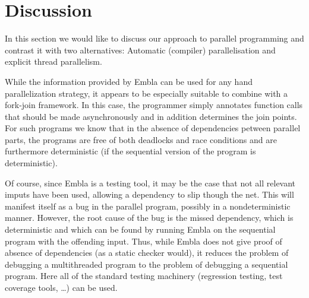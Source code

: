 \section{Discussion}

In this section we would like to discuss our approach to parallel
programming and contrast it with two alternatives: Automatic 
(compiler) parallelisation and explicit thread parallelism.

While the information provided by Embla can be used for any hand 
parallelization strategy, it appears to be especially suitable to
combine with a fork-join framework. In this case, the programmer 
simply annotates function calls that should be made asynchronously 
and in addition determines the join points. For such programs we
know that in the absence of dependencies petween parallel parts,
the programs are free of both deadlocks and race conditions and are 
furthermore deterministic (if the sequential version of the program 
is deterministic).

Of course, since Embla is a testing tool, it may be the case that not
all relevant imputs have been used, allowing a dependency to slip
though the net. This will manifest itself as a bug in the parallel
program, possibly in a nondeterministic manner. However, the root
cause of the bug is the missed dependency, which is deterministic and
which can be found by running Embla on the sequential program 
with the offending input. Thus,
while Embla does not give proof of absence of dependencies (as a
static checker would), it reduces the problem of debugging a
multithreaded program to the problem of debugging a sequential
program. Here all of the standard testing machinery (regression 
testing, test coverage tools, \ldots) can be used.

